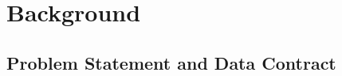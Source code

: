 %
%
\section{Background}
\label{sec:background}

\subsection{Problem Statement and Data Contract}
\label{sec:bg-problem}

